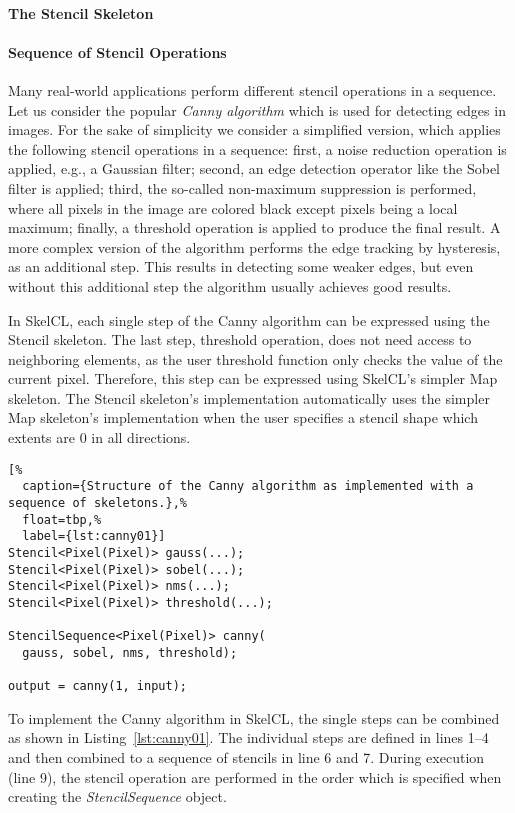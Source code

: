 \paragraph{The Stencil Skeleton}

\paragraph{Sequence of Stencil Operations}
Many real-world applications perform different stencil operations in a sequence.
Let us consider the popular \emph{Canny algorithm} which is used for detecting edges in images.
For the sake of simplicity we consider a simplified version, which applies the following stencil operations in a sequence:
first, a noise reduction operation is applied, e.g., a Gaussian filter;
second, an edge detection operator like the Sobel filter is applied;
third, the so-called non-maximum suppression is performed, where all pixels in the image are colored black except pixels being a local maximum;
finally, a threshold operation is applied to produce the final result.
A more complex version of the algorithm performs the edge tracking by hysteresis, as an additional step.
This results in detecting some weaker edges, but even without this
additional step the algorithm usually achieves good results.

In SkelCL, each single step of the Canny algorithm can be expressed using the Stencil skeleton.
The last step, threshold operation, does not need access to neighboring elements, as the user threshold function only checks the value of the current pixel.
Therefore, this step can be expressed using SkelCL's simpler Map skeleton.
The Stencil skeleton's implementation automatically uses the simpler Map skeleton's implementation when the user specifies a stencil shape which extents are $0$ in all directions.

\begin{lstlisting}[%
  caption={Structure of the Canny algorithm as implemented with a sequence of skeletons.},%
  float=tbp,%
  label={lst:canny01}]
Stencil<Pixel(Pixel)> gauss(...);
Stencil<Pixel(Pixel)> sobel(...);
Stencil<Pixel(Pixel)> nms(...);
Stencil<Pixel(Pixel)> threshold(...);

StencilSequence<Pixel(Pixel)> canny(
  gauss, sobel, nms, threshold);

output = canny(1, input);
\end{lstlisting}

To implement the Canny algorithm in SkelCL, the single steps can be combined as shown in Listing~\ref{lst:canny01}.
The individual steps are defined in lines 1--4 and then combined to a sequence of stencils in line 6 and 7.
During execution (line 9), the stencil operation are performed in the order which is specified when creating the \emph{StencilSequence} object.

